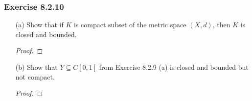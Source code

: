 \subsubsection{Exercise 8.2.10} 
\begin{enumerate}
    \item[(a)] Show that if \( K  \) is compact subset of the metric space \( (X,d)  \), then \( K  \) is closed and bounded.       
        \begin{proof}
        
        \end{proof}
    \item[(b)] Show that \( Y \subseteq C[0,1]  \) from Exercise 8.2.9 (a) is closed and bounded but not compact.
        \begin{proof}
        
        \end{proof}
\end{enumerate}





